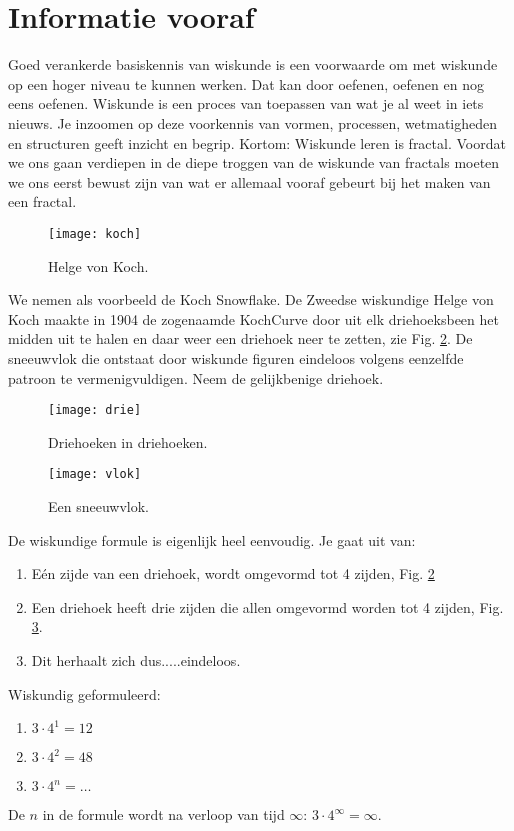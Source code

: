 \documentclass[11pt,fleqn]{book} %
\begin{document}
\section{Informatie vooraf}
Goed verankerde basiskennis van wiskunde is een voorwaarde om met wiskunde op een hoger niveau te kunnen werken. Dat kan door oefenen, oefenen en nog eens oefenen. Wiskunde is een proces van toepassen van wat je al weet in iets nieuws. Je inzoomen op deze voorkennis van vormen, processen, wetmatigheden en structuren geeft inzicht en begrip. Kortom: Wiskunde leren is fractal. 
Voordat we ons gaan verdiepen in de diepe troggen van de wiskunde van fractals moeten we ons eerst bewust zijn van wat er allemaal vooraf gebeurt bij het maken van een fractal. 
\begin{figure}[h]
	\centering\texttt{[image: koch]}
	\caption{Helge von Koch.}
	\label{fig:koch}
\end{figure}
We nemen als voorbeeld de Koch Snowflake. De Zweedse wiskundige Helge von Koch maakte in 1904 de zogenaamde KochCurve door uit elk driehoeksbeen het midden uit te halen en daar weer een driehoek neer te zetten, zie Fig. \ref{fig:drie}. De sneeuwvlok die ontstaat door wiskunde figuren eindeloos volgens eenzelfde patroon te vermenigvuldigen. Neem de gelijkbenige driehoek. 
\begin{figure}[h]
	\centering\texttt{[image: drie]}
	\caption{Driehoeken in driehoeken.}
	\label{fig:drie}
\end{figure}
\begin{figure}[h]
	\centering\texttt{[image: vlok]}
	\caption{Een sneeuwvlok.}
	\label{fig:vlok}
\end{figure}

De wiskundige formule is eigenlijk heel eenvoudig. Je gaat uit van: 
\begin{enumerate}
\item Eén zijde van een driehoek, wordt omgevormd tot 4 zijden, Fig. \ref{fig:drie}
\item Een driehoek heeft drie zijden die allen omgevormd worden tot 4 zijden, Fig. \ref{fig:vlok}. 
\item Dit herhaalt zich dus.....eindeloos.
\end{enumerate}
Wiskundig geformuleerd:
\begin{enumerate}
\item $3\cdot 4^1=12$
\item $3\cdot 4^2=48$
\item $3\cdot 4^n=\ldots$
\end{enumerate}
De $n$ in de formule wordt na verloop van tijd $\infty$: $3\cdot 4^\infty=\infty$.
\end{document}
